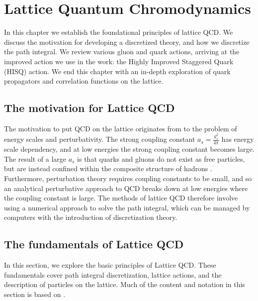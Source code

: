 \chapter{Lattice Quantum Chromodynamics}\label{cha:Lattice_QCD}
In this chapter we establish the foundational principles of lattice QCD. We discuss the motivation for developing a discretized theory, and how we discretize the path integral.  We review various gluon and quark actions, arriving at the improved action we use in the work: the Highly Improved Staggered Quark (HISQ) action.  We end this chapter with an in-depth exploration of quark propagators and correlation functions on the lattice.

\section{The motivation for Lattice QCD}\label{sec:motivation_for_LQCD}
The motivation to put QCD on the lattice originates from to the problem of energy scales and perturbativity.  The strong coupling constant $a_s = \frac{g_s^2}{4\pi}$ has energy scale dependency, and at low energies the strong coupling constant becomes large.  The result of a large $a_s$ is that quarks and gluons do not exist as free particles, but are instead confined within the composite structure of hadrons \cite{PhysRevD.10.2445}.  Furthermore, perturbation theory requires coupling constants to be small, and so an analytical perturbative approach to QCD breaks down at low energies where the coupling constant is large.  The methods of lattice QCD therefore involve using a numerical approach to solve the path integral, which can be managed by computers with the introduction of discretization theory.

\section{The fundamentals of Lattice QCD}\label{sec:fundementals_of_LQCD}
In this section, we explore the basic principles of Lattice QCD.  These fundamentals cover path integral discretization, lattice actions, and the description of particles on the lattice.  Much of the content and notation in this section is based on \cite{lepage2005latticeqcdnovices}.


